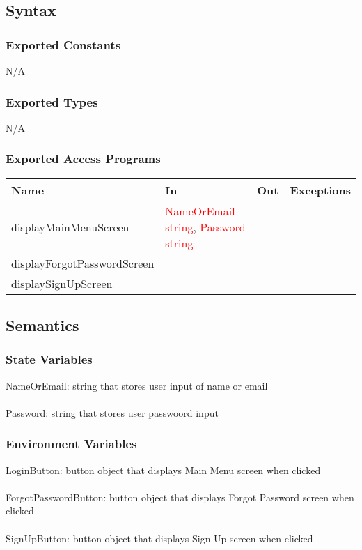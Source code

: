 \documentclass[12pt, titlepage]{article}
\begin{document}
\subsection{Syntax}

\subsubsection{Exported Constants}
N/A

\subsubsection{Exported Types}
N/A

\subsubsection{Exported Access Programs}

\begin{tabular}{| l | l | l | l |}
	\hline
	{\textbf{Name}} & {\textbf{In}} & {\textbf{Out}} & {\textbf{Exceptions}}\\
	\hline
	{displayMainMenuScreen} & {\textcolor{red}{\sout{NameOrEmail}}} \textcolor{red}{string}, {\textcolor{red}{\sout{Password}}} \textcolor{red}{string}& & \\
	\hline
	{displayForgotPasswordScreen} & & & \\
	\hline
	{displaySignUpScreen} & & & \\
	\hline
\end{tabular}

\subsection{Semantics}

\subsubsection{State Variables}
NameOrEmail: string that stores user input of name or email\\\\
Password: string that stores user passwoord input

\subsubsection{Environment Variables}
LoginButton: button object that displays Main Menu screen when clicked\\\\
ForgotPasswordButton: button object that displays Forgot Password screen when clicked\\\\
SignUpButton: button object that displays Sign Up screen when clicked
\end{document}
